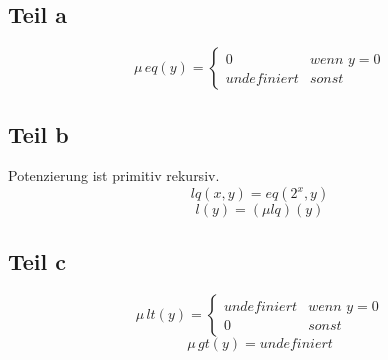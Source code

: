 \documentclass[10pt,a4paper]{article}
\begin{document}
\subsection{Teil a}

\begin{equation}
  \mu \, eq (y) = \begin{cases}
    0 & \textit{wenn $y = 0$}\\
    undefiniert & \textit{sonst}
  \end{cases}
\end{equation}

\subsection{Teil b}

Potenzierung ist primitiv rekursiv.
\begin{equation}
  lq(x, y) = eq(2^{x}, y)
\end{equation}
\begin{equation}
  l(y) = (\mu lq)(y)
\end{equation}

\subsection{Teil c}

\begin{equation}
  \mu\, lt(y) = \begin{cases}
    undefiniert & \textit{wenn $y = 0$}\\
    0 & \textit{sonst}
  \end{cases}
\end{equation}
\begin{equation}
  \mu\, gt(y) = undefiniert
\end{equation}
\end{document}
